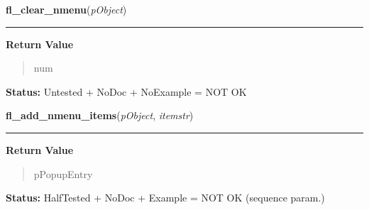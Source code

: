     \label{xformslib:library:fl_clear_nmenu}

    \vspace{0.5ex}

\hspace{.8\funcindent}\begin{boxedminipage}{\funcwidth}

    \raggedright \textbf{fl\_clear\_nmenu}(\textit{pObject})

    \vspace{-1.5ex}

    \rule{\textwidth}{0.5\fboxrule}
\setlength{\parskip}{2ex}
\setlength{\parskip}{1ex}
      \textbf{Return Value}
    \vspace{-1ex}

      \begin{quote}
      num

      \end{quote}

\textbf{Status:} Untested + NoDoc + NoExample = NOT OK



    \end{boxedminipage}

    \label{xformslib:library:fl_add_nmenu_items}

    \vspace{0.5ex}

\hspace{.8\funcindent}\begin{boxedminipage}{\funcwidth}

    \raggedright \textbf{fl\_add\_nmenu\_items}(\textit{pObject}, \textit{itemstr})

    \vspace{-1.5ex}

    \rule{\textwidth}{0.5\fboxrule}
\setlength{\parskip}{2ex}
\setlength{\parskip}{1ex}
      \textbf{Return Value}
    \vspace{-1ex}

      \begin{quote}
      pPopupEntry

      \end{quote}

\textbf{Status:} HalfTested + NoDoc + Example = NOT OK (sequence param.)



    \end{boxedminipage}

